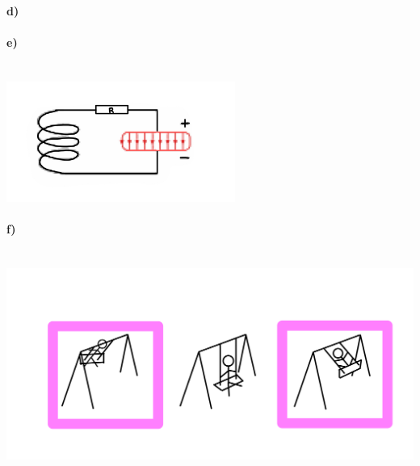 \documentclass[12pt,a4paper]{report}
\begin{document}
	\paragraph{d)}
	
	\paragraph{e)} \mbox{} \\
	\includegraphics[width=7.5cm]{JPEG-Bild-4D19-A018-AA-0.jpeg}
	\paragraph{f)} \mbox{} \\
	\includegraphics[width=14cm]{JPEG-Bild-44FC-9A9F-C8-0.jpeg}
\end{document}
